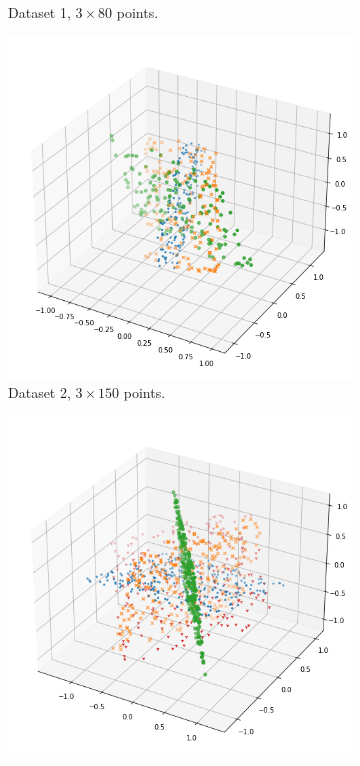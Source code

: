 \begin{figure}
\begin{subfigure}{.3\textwidth}
        \caption{Dataset 1, $3\times 80$ points.}
    \end{subfigure}%
    \hspace{1em}
    \begin{subfigure}{.3\textwidth}
        \centering
        \includegraphics[width=\textwidth]{pics/ds2.png}
        \caption{Dataset 2, $3\times 150$ points.}
    \end{subfigure}%
    \hspace{1em}
    \begin{subfigure}{.3\textwidth}
        \centering
        \includegraphics[width=\textwidth]{pics/ds3.png}

\end{subfigure}
\end{figure}
